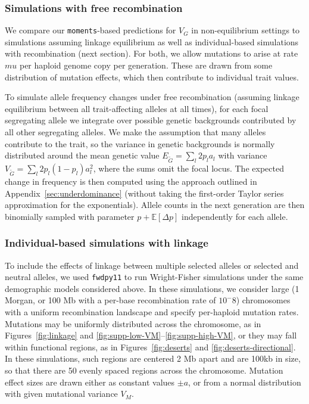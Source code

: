 \documentclass{article}
\newcommand{\E}{\mathbb{E}}
\newcommand{\moments}{\texttt{moments}\xspace}
\newcommand{\fwdpy}{\texttt{fwdpy11}\xspace}
\begin{document}
\subsubsection*{Simulations with free recombination}

We compare our \moments-based predictions for $V_G$ in non-equilibrium settings
to simulations assuming linkage equilibrium as well as individual-based
simulations with recombination (next section). For both, we allow mutations
to arise at rate $mu$ per haploid genome copy per generation. These are drawn
from some distribution of mutation effects, which then contribute to individual
trait values.

To simulate allele frequency changes under free recombination (assuming linkage
equilibrium between all trait-affecting alleles at all times), for each focal
segregating allele we integrate over possible genetic backgrounds contributed
by all other segregating alleles. We make the assumption that many alleles
contribute to the trait, so the variance in genetic backgrounds is normally
distributed around the mean genetic value $E_{\tilde{G}}=\sum_l 2p_l a_l$ with
variance $V_{\tilde{G}}=\sum_l 2p_l(1-p_l)a_l^2$, where the sums omit the focal
locus. The expected change in frequency is then computed using the approach
outlined in Appendix~\ref{sec:underdominance} (without taking the first-order
Taylor series approximation for the exponentials). Allele counts in the next
generation are then binomially sampled with parameter $p+\E[\Delta p]$
independently for each allele.

\subsubsection*{Individual-based simulations with linkage}

To include the effects of linkage between multiple selected alleles or selected
and neutral alleles, we used \fwdpy \citep{thornton2019polygenic} to run
Wright-Fisher simulations under the same demographic models considered above.
In these simulations, we consider large (1 Morgan, or 100 Mb with a per-base
recombination rate of $10^-8$) chromosomes with a uniform recombination
landscape and specify per-haploid mutation rates. Mutations may be uniformly
distributed across the chromosome, as in Figures~\ref{fig:linkage} and
\ref{fig:supp-low-VM}--\ref{fig:supp-high-VM}, or they may fall within
functional regions, as in Figures~\ref{fig:deserts} and
\ref{fig:deserts-directional}. In these simulations, such regions are centered
2 Mb apart and are 100kb in size, so that there are 50 evenly spaced regions
across the chromosome. Mutation effect sizes are drawn either as constant
values $\pm a$, or from a normal distribution with given mutational variance
$V_M$.
\end{document}
